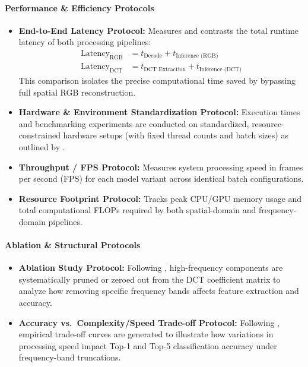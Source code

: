 \documentclass[11pt]{article}
\begin{document}
\paragraph{Performance \& Efficiency Protocols}
\begin{itemize}
    \item \textbf{End-to-End Latency Protocol:} Measures and contrasts the total runtime latency of both processing pipelines:
    \begin{align*}
        \text{Latency}_{\text{RGB}} &= t_{\text{Decode}} + t_{\text{Inference (RGB)}} \\
        \text{Latency}_{\text{DCT}} &= t_{\text{DCT Extraction}} + t_{\text{Inference (DCT)}}
    \end{align*}
    This comparison isolates the precise computational time saved by bypassing full spatial RGB reconstruction.

    \item \textbf{Hardware \& Environment Standardization Protocol:} Execution times and benchmarking experiments are conducted on standardized, resource-constrained hardware setups (with fixed thread counts and batch sizes) as outlined by \citet{canziani2016analysis}.

    \item \textbf{Throughput / FPS Protocol:} Measures system processing speed in frames per second (FPS) for each model variant across identical batch configurations.

    \item \textbf{Resource Footprint Protocol:} Tracks peak CPU/GPU memory usage and total computational FLOPs required by both spatial-domain and frequency-domain pipelines.
\end{itemize}

\paragraph{Ablation \& Structural Protocols}
\begin{itemize}
    \item \textbf{Ablation Study Protocol:} Following \citet{meyes2019ablation}, high-frequency components are systematically pruned or zeroed out from the DCT coefficient matrix to analyze how removing specific frequency bands affects feature extraction and accuracy.

    \item \textbf{Accuracy vs.\ Complexity/Speed Trade-off Protocol:} Following \citet{gueguen2018faster}, empirical trade-off curves are generated to illustrate how variations in processing speed impact Top-1 and Top-5 classification accuracy under frequency-band truncations.
\end{itemize}
\end{document}
